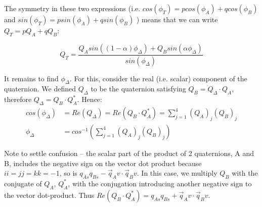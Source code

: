 \documentclass[11pt,fleqn]{report}
\begin{document}
The symmetry in these two expressions (i.e.
 $cos( \phi_T) = p cos( \phi_A) + q cos( \phi_B)$ and
 $sin( \phi_T) = p sin( \phi_A) + q sin( \phi_B)$ )
means that we can write $Q_T = p Q_A + q Q_B$:

\begin{equation}\label{eqn:slerp}
 Q_T = \frac { Q_A sin( (1-\alpha) \phi_\Delta) +
               Q_B sin( \alpha \phi_\Delta)}
             { sin(\phi_\Delta)}
\end{equation}

It remains to find $\phi_\Delta$.  For this, consider the real (i.e. scalar)
component of the quaternion.  We defined $Q_\Delta$ to be the quaternion
satisfying $Q_B = Q_\Delta \cdot Q_A$,
therefore $Q_\Delta = Q_B \cdot Q_A^*$.  Hence:
\begin{align}
 cos (\phi_\Delta) &= Re(Q_\Delta) = Re(Q_B \cdot Q_A^*) =
 \sum_{j=1}^4 (Q_A)_j  (Q_B)_j \\
\phi_\Delta &= cos^{-1} \left( \sum_{j=1}^4 (Q_A)_j (Q_B)_j \right)
\end{align}

Note to settle confusion -- the scalar part of the product of 2 quaternions,
A and B, includes the negative sign on the vector dot product because $ii =
jj = kk = -1$, so is $q_{As} q_{Bs} - \vec q_Av \cdot \vec q_Bv$.  In this
case, we multiply $Q_B$ with the conjugate of $Q_A$, $Q_A^*$, with the
conjugation introducing another negative sign to the vector dot-product.
Thus $Re(Q_B \cdot Q_A^*) =  q_{As} q_{Bs} + \vec q_Av \cdot \vec q_Bv$.

\end{document}
